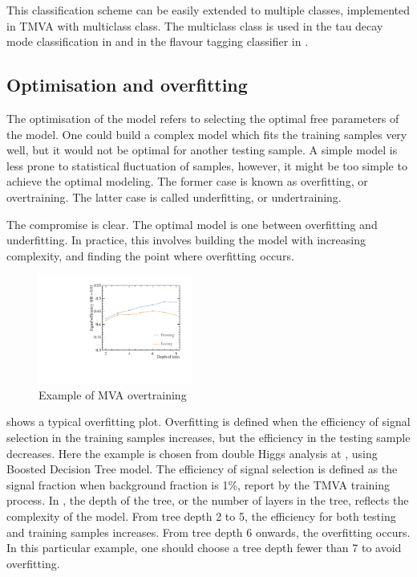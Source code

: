 This classification scheme can be easily extended to multiple classes, implemented in TMVA with multiclass class. The multiclass class is used in the tau decay mode classification in \Section{} and in the flavour tagging classifier in .

\subsection{Optimisation and overfitting}

The optimisation of the model refers to selecting the optimal free parameters of the model. One could build a complex model which fits the training samples very well, but it would not be optimal for another testing sample. A simple model is less prone to statistical fluctuation of samples, however, it might be too simple to achieve the optimal modeling. The former case is known as overfitting, or overtraining. The latter case is called underfitting, or undertraining.

The compromise is clear. The optimal model is one between overfitting and underfitting. In practice, this involves building the model with increasing complexity, and finding the point where overfitting occurs.

\begin{figure}[!tbp]
\includegraphics[width=0.45\textwidth]{doubleHiggs/DepthOfTrees.pdf}
\caption{Example of MVA overtraining}
\label{fig:doubleHiggsMVAovertraining}
\end{figure}

 shows a typical overfitting plot. Overfitting is defined when the efficiency of signal selection in the training samples increases, but the efficiency in the testing sample decreases. Here the example is chosen from double Higgs analysis at , using Boosted Decision Tree model. The efficiency of signal selection is defined as the signal fraction when background fraction is 1\%, report by the TMVA training process. In  , the depth of the tree, or the number of layers in the tree, reflects the complexity of the model. From tree depth 2 to 5, the efficiency for both testing and training samples increases. From tree depth 6 onwards, the overfitting occurs. In this particular example, one should choose a tree depth fewer than 7 to avoid overfitting.

